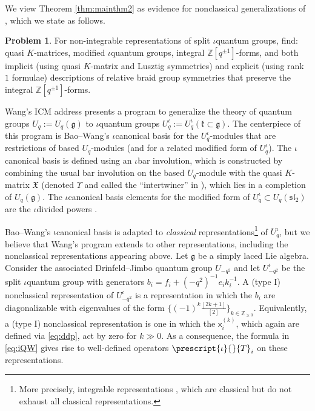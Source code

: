 \documentclass[10pt]{amsart}
\numberwithin{equation}{section}
\theoremstyle{definition}
\newtheorem{problem}[thm]{Problem}
\newcommand{\iQW}{\prescript{\iota}{}{T}}
\newcommand{\xxb}{\mathsf{x}}
\begin{document}
We view Theorem \ref{thm:mainthm2} as evidence for nonclassical generalizations 
of \cite[Problem 1.1]{wang2026relativebraidgroupsymmetries}, 
which we state as follows.

\begin{problem}
For non-integrable representations of split $\iota$quantum groups, find: 
quasi $K$-matrices, modified $\iota$quantum groups, integral $\mathbb{Z}[q^{\pm 1}]$-forms, 
and both implicit (using quasi $K$-matrix and Lusztig symmetries) and explicit (using rank $1$ formulae) 
descriptions of relative braid group symmetries that preserve the integral $\mathbb{Z}[q^{\pm 1}]$-forms.
\end{problem}

Wang's ICM address \cite{WangICM} presents a program to generalize the theory of quantum groups $U_q:=U_q(\mathfrak{g})$ 
to $\iota$quantum groups $U_q^{\iota}:=U_q^{\iota}(\mathfrak{k}\subset \mathfrak{g})$. 
The centerpiece of this program is Bao--Wang's $\iota$canonical basis \cite{BW-icanonical} 
for the $U_q^{\iota}$-modules that are restrictions of based $U_q$-modules (and for a related modified form of $U_q^{\iota}$).
The $\iota$canonical basis is defined using an $\iota$bar involution, 
which is constructed by combining the usual bar involution on the based $U_q$-module 
with the quasi $K$-matrix $\mathfrak{X}$ 
(denoted $\Upsilon$ and called the ``intertwiner'' in \cite{MR3864017, BW-icanonical}), 
which lies in a completion of $U_q(\mathfrak{g})$. 
The $\iota$canonical basis elements for the modified form of $U_q^{\iota}\subset U_q(\mathfrak{sl}_2)$ are the $\iota$divided powers \cite{MR3783013}. 

Bao--Wang's $\iota$canonical basis is adapted to \emph{classical} representations\footnote{More precisely, 
integrable representations \cite[Section 2.5]{wang2026relativebraidgroupsymmetries}, 
which are classical but do not exhaust all classical representations.} 
of $U_q^\iota$, 
but we believe that Wang's program extends to other representations, including the nonclassical representations appearing above.
Let $\mathfrak{g}$ be a simply laced Lie algebra. 
Consider the associated Drinfeld--Jimbo quantum group $U_{-q^2}$ 
and let $U_{-q^2}^{\iota}$ be the split $\iota$quantum group with generators $b_i = f_i+(-q^2)^{-1}e_ik_i^{-1}$. 
A (type I) nonclassical representation of $U_{-q^2}^{\iota}$ is a representation in which the $b_i$ are diagonalizable 
with eigenvalues of the form $\{(-1)^k\frac{[2k+1]}{[2]}\}_{k\in \mathbb{Z}_{\ge 0}}$.
Equivalently, a (type I) nonclassical representation is one in which the $\xxb_i^{(k)}$,
which again are defined via \eqref{eq:ddp}, act by zero for $k\gg0$. 
As a consequence, the formula in \eqref{eq:iQW} gives rise to well-defined operators $\iQW_i$ 
on these representations.
\end{document}
